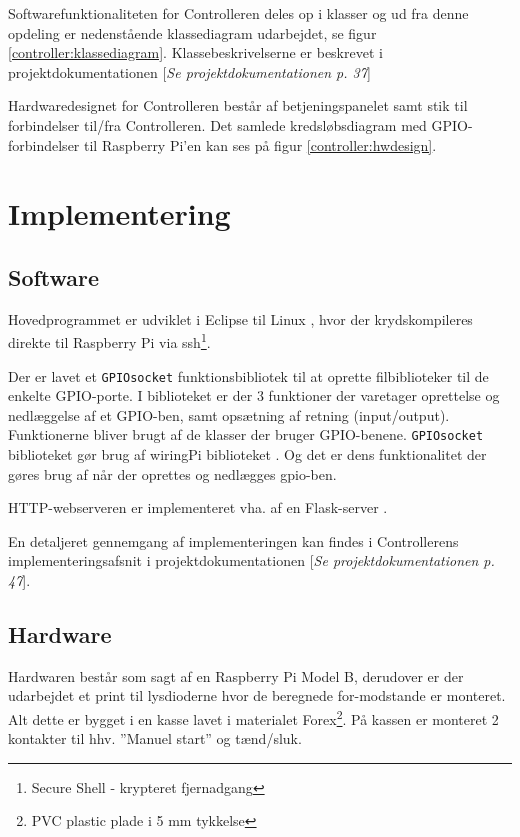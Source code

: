 Softwarefunktionaliteten for Controlleren deles op i klasser og ud fra denne opdeling er nedenstående klassediagram udarbejdet, se figur \ref{controller:klassediagram}. Klassebeskrivelserne er beskrevet i projektdokumentationen [\textit{Se projektdokumentationen p. 37}]


Hardwaredesignet for Controlleren består af betjeningspanelet samt stik til forbindelser til/fra Controlleren. Det samlede kredsløbsdiagram med GPIO-forbindelser til Raspberry Pi'en kan ses på figur \ref{controller:hwdesign}.


\section{Implementering}
\label{ctrl_implementering}

\subsection*{Software}

Hovedprogrammet er udviklet i Eclipse til Linux \citep{website:eclipsekepler}, hvor der krydskompileres direkte til Raspberry Pi via ssh\footnote{Secure Shell - krypteret fjernadgang}.

Der er lavet et \verb+GPIOsocket+ funktionsbibliotek til at oprette filbiblioteker til de enkelte GPIO-porte. I biblioteket er der 3 funktioner der varetager oprettelse og nedlæggelse af et GPIO-ben, samt opsætning af retning (input/output). Funktionerne bliver brugt af de klasser der bruger GPIO-benene. \verb+GPIOsocket+ biblioteket gør brug af wiringPi biblioteket \citep{website:wiringpi}. Og det er dens funktionalitet der gøres brug af når der oprettes og nedlægges gpio-ben.

HTTP-webserveren er implementeret vha. af en Flask-server \citep{website:flask}.

En detaljeret gennemgang af implementeringen kan findes i Controllerens implementeringsafsnit i projektdokumentationen [\textit{Se projektdokumentationen p. 47}].

\subsection*{Hardware}

Hardwaren består som sagt af en Raspberry Pi Model B, derudover er der udarbejdet et print til lysdioderne hvor de beregnede for-modstande er monteret. Alt dette er bygget i en kasse lavet i materialet Forex\footnote{PVC plastic plade i 5 mm tykkelse}. På kassen er monteret 2 kontakter til hhv. ''Manuel start'' og tænd/sluk.
